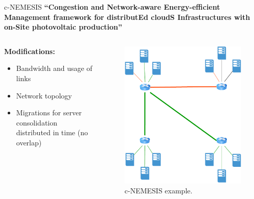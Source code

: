 \documentclass[Ligatures=TeX,table,svgnames,usetotalslideindicator,compress,10pt,aspectratio=169]{beamer}
\begin{document}
\begin{frame}{c-NEMESIS}  
  \textbf {``\alert{Congestion} and \alert{N}etwork-aware \alert{E}nergy-efficient
    \alert{M}anagement framework for distribut\alert{E}d cloud\alert{S} \alert{I}nfrastructures with on-\alert{S}ite photovoltaic production''}
  \begin{columns}        
    \begin{column}{0.7\textwidth}
\small
\textbf{Modifications:}
\begin{itemize}
    \item Bandwidth and usage of links
    \item Network topology
    \item Migrations for server consolidation distributed in time (no overlap)

  \end{itemize}
  
\end{column}   

\begin{column}{0.3\textwidth}
      \begin{figure}[!h]
        \centering
        \includegraphics[width=.9\textwidth]{images/cnemesis_3.pdf}
        \caption{c-NEMESIS example.}
      \end{figure}
    \end{column}        

\end{columns}

\end{frame}
\end{document}
